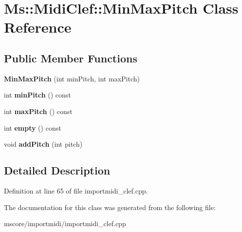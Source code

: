\hypertarget{class_ms_1_1_midi_clef_1_1_min_max_pitch}{}\section{Ms\+:\+:Midi\+Clef\+:\+:Min\+Max\+Pitch Class Reference}
\label{class_ms_1_1_midi_clef_1_1_min_max_pitch}
\subsection*{Public Member Functions}
\begin{DoxyCompactItemize}
\item 
\mbox{\label{class_ms_1_1_midi_clef_1_1_min_max_pitch_aa7dbef0e8dadda11f0a73f92584f35cf}} 
{\bfseries Min\+Max\+Pitch} (int min\+Pitch, int max\+Pitch)
\item 
\mbox{\label{class_ms_1_1_midi_clef_1_1_min_max_pitch_a109660c7e2ae04f74fdf8bc990fe8b68}} 
int {\bfseries min\+Pitch} () const
\item 
\mbox{\label{class_ms_1_1_midi_clef_1_1_min_max_pitch_a13a3b8f67efc39a5e5a292ea72fefc99}} 
int {\bfseries max\+Pitch} () const
\item 
\mbox{\label{class_ms_1_1_midi_clef_1_1_min_max_pitch_a0a0d42272f87dbda37939b9af0d8bf69}} 
int {\bfseries empty} () const
\item 
\mbox{\label{class_ms_1_1_midi_clef_1_1_min_max_pitch_ac256ff26ffa6d6ae107696489389e27f}} 
void {\bfseries add\+Pitch} (int pitch)
\end{DoxyCompactItemize}


\subsection{Detailed Description}


Definition at line 65 of file importmidi\+\_\+clef.\+cpp.



The documentation for this class was generated from the following file\+:\begin{DoxyCompactItemize}
\item 
mscore/importmidi/importmidi\+\_\+clef.\+cpp\end{DoxyCompactItemize}
